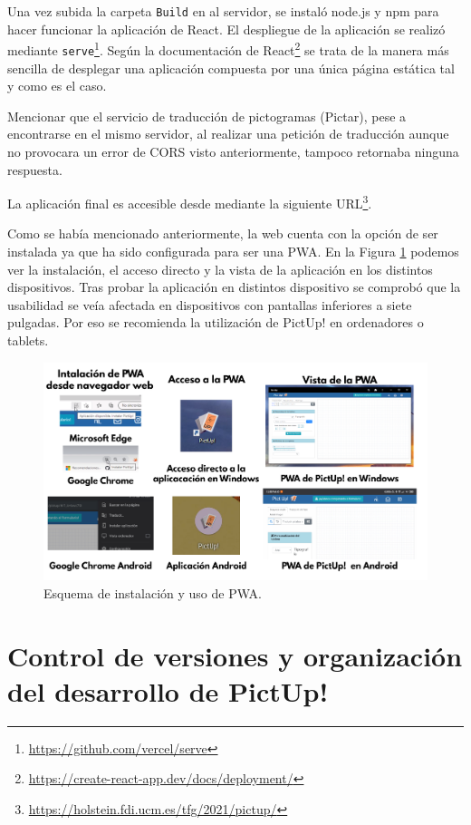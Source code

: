 Una vez subida la carpeta \texttt{Build} en al servidor, se instaló \texttt{}node.js y npm para hacer funcionar la aplicación de React. El despliegue de la aplicación se realizó mediante \texttt{serve}\footnote{\url{https://github.com/vercel/serve}}. Según la documentación de React\footnote{\url{https://create-react-app.dev/docs/deployment/}} se trata de la manera más sencilla de desplegar una aplicación compuesta por una única página estática tal y como es el caso. 

Mencionar que el servicio de traducción de pictogramas (Pictar), pese a encontrarse en el mismo servidor, al realizar una petición de traducción aunque no provocara un error de CORS visto anteriormente, tampoco retornaba ninguna respuesta. 

La aplicación final es accesible desde mediante la siguiente URL\footnote{\url{https://holstein.fdi.ucm.es/tfg/2021/pictup/}}.

Como se había mencionado anteriormente, la web cuenta con la opción de ser instalada ya que ha sido configurada para ser una PWA. En la Figura \ref{fig:pwa} podemos ver la instalación, el acceso directo y la vista de la aplicación en los distintos dispositivos. Tras probar la aplicación en distintos dispositivo se comprobó que la usabilidad se veía afectada en dispositivos con pantallas inferiores a siete pulgadas. Por eso se recomienda la utilización de PictUp! en ordenadores o tablets.

\begin{figure}[h!]
	\centering
	\includegraphics[width=\linewidth]{Imagenes/Bitmap/pwa}
	\caption{Esquema de instalación y uso de PWA. }
	\label{fig:pwa}
\end{figure}



\section{Control de versiones y organización del desarrollo de PictUp!}
\label{cap5:controlversiones}

